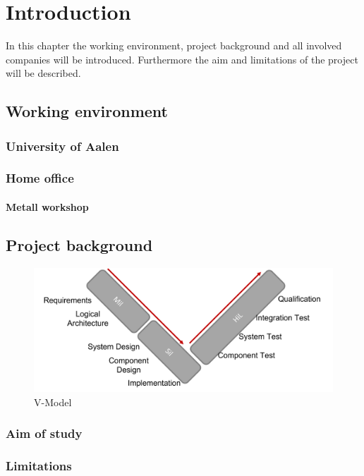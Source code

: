\chapter{Introduction}
\label{introductio}

In this chapter the working environment, project background and all involved companies will be introduced. Furthermore the aim and limitations of the project will be described. 

\section{Working environment}
\subsection{University of Aalen}

\subsection{Home office}

\subsubsection{Metall workshop}


\section{Project background}

\begin{figure}[h!]
    \begin{center}
    \includegraphics[width=12cm]{Pictures/VModelComplete.png}
    \caption[V-Model Complete]{V-Model}
    \label{V-Model Complete}
    \end{center}
\end{figure}

\subsection{Aim of study}


\subsection{Limitations}


